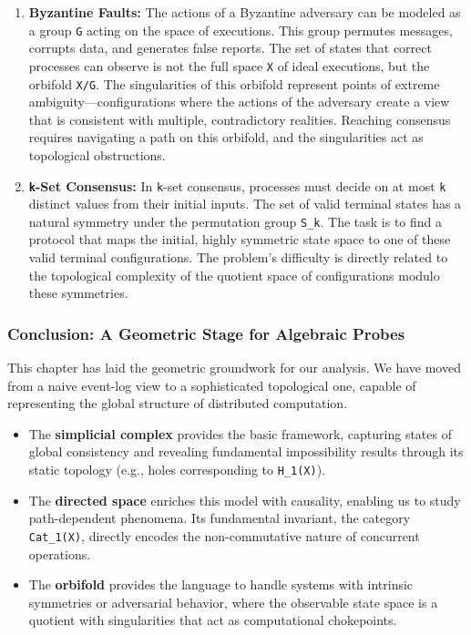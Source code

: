 \documentclass[
]{article}
\begin{document}
\begin{enumerate}
\def\labelenumi{\arabic{enumi}.}
\item
  \textbf{Byzantine Faults:} The actions of a Byzantine adversary can be
  modeled as a group \texttt{G} acting on the space of executions. This
  group permutes messages, corrupts data, and generates false reports.
  The set of states that correct processes can observe is not the full
  space \texttt{X} of ideal executions, but the orbifold \texttt{X/G}.
  The singularities of this orbifold represent points of extreme
  ambiguity---configurations where the actions of the adversary create a
  view that is consistent with multiple, contradictory realities.
  Reaching consensus requires navigating a path on this orbifold, and
  the singularities act as topological obstructions.
\item
  \textbf{\texttt{k}-Set Consensus:} In \texttt{k}-set consensus,
  processes must decide on at most \texttt{k} distinct values from their
  initial inputs. The set of valid terminal states has a natural
  symmetry under the permutation group \texttt{S\_k}. The task is to
  find a protocol that maps the initial, highly symmetric state space to
  one of these valid terminal configurations. The problem's difficulty
  is directly related to the topological complexity of the quotient
  space of configurations modulo these symmetries.
\end{enumerate}

\subsubsection{\texorpdfstring{\textbf{Conclusion: A Geometric Stage for
Algebraic
Probes}}{Conclusion: A Geometric Stage for Algebraic Probes}}\label{conclusion-a-geometric-stage-for-algebraic-probes}

This chapter has laid the geometric groundwork for our analysis. We have
moved from a naive event-log view to a sophisticated topological one,
capable of representing the global structure of distributed computation.

\begin{itemize}
\item
  The \textbf{simplicial complex} provides the basic framework,
  capturing states of global consistency and revealing fundamental
  impossibility results through its static topology (e.g., holes
  corresponding to \texttt{H\_1(X)}).
\item
  The \textbf{directed space} enriches this model with causality,
  enabling us to study path-dependent phenomena. Its fundamental
  invariant, the category \texttt{Cat\_1(X)}, directly encodes the
  non-commutative nature of concurrent operations.
\item
  The \textbf{orbifold} provides the language to handle systems with
  intrinsic symmetries or adversarial behavior, where the observable
  state space is a quotient with singularities that act as computational
  chokepoints.
\end{itemize}
\end{document}
